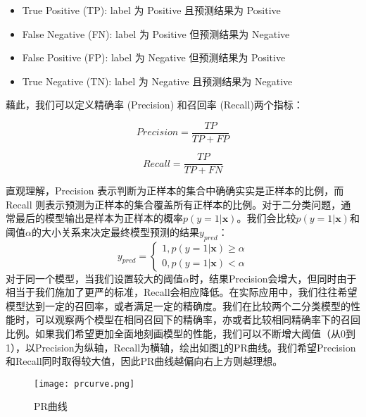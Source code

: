 \documentclass[lang=cn,newtx,10pt,scheme=chinese,color=black]{elegantbook}
\begin{document}
\begin{itemize}
  \item True Positive (TP): label 为 Positive 且预测结果为 Positive
  \item False Negative (FN): label 为 Positive 但预测结果为 Negative
  \item False Positive (FP): label 为 Negative 但预测结果为 Positive
  \item True Negative (TN): label 为 Negative 且预测结果为 Negative
\end{itemize}

藉此，我们可以定义精确率 (Precision) 和召回率 (Recall)两个指标：

\begin{equation}
  \label{precision}
  Precision=\frac{TP}{TP+FP}
\end{equation}

\begin{equation}
  \label{recall}
  Recall=\frac{TP}{TP+FN}
\end{equation}

直观理解，Precision 表示判断为正样本的集合中确确实实是正样本的比例，而 Recall 则表示预测为正样本的集合覆盖所有正样本的比例。对于二分类问题，通常最后的模型输出是样本为正样本的概率$p(y=1|\bm{x})$。我们会比较$p(y=1|\bm{x})$和阈值$\alpha$的大小关系来决定最终模型预测的结果$y_{pred}$：
\begin{equation}
  \label{binary_pred}
  y_{pred}=\left\{
    \begin{aligned}
      1, p(y=1|\bm{x})\geq \alpha \\
      0, p(y=1|\bm{x}) < \alpha
    \end{aligned}
  \right.
\end{equation}
对于同一个模型，当我们设置较大的阈值$\alpha$时，结果Precision会增大，但同时由于相当于我们施加了更严的标准，Recall会相应降低。在实际应用中，我们往往希望模型达到一定的召回率，或者满足一定的精确度。我们在比较两个二分类模型的性能时，可以观察两个模型在相同召回下的精确率，亦或者比较相同精确率下的召回比例。如果我们希望更加全面地刻画模型的性能，我们可以不断增大阈值（从0到1），以Precision为纵轴，Recall为横轴，绘出如图\ref{fig:prcurve}的PR曲线。我们希望Precision和Recall同时取得较大值，因此PR曲线越偏向右上方则越理想。

\begin{figure}[htbp]
  \centering
  \texttt{[image: prcurve.png]}
  \caption{PR曲线 \label{fig:prcurve}}
\end{figure}
\end{document}
